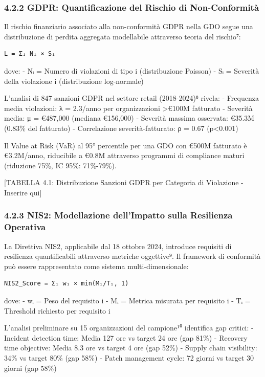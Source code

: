 \documentclass[12pt,a4paper,oneside]{book}
\begin{document}
\subsubsection{4.2.2 GDPR: Quantificazione del Rischio di
Non-Conformità}\label{gdpr-quantificazione-del-rischio-di-non-conformituxe0}

Il rischio finanziario associato alla non-conformità GDPR nella GDO
segue una distribuzione di perdita aggregata modellabile attraverso
teoria del rischio⁷:

\begin{verbatim}
L = Σᵢ Nᵢ × Sᵢ
\end{verbatim}

dove: - Nᵢ = Numero di violazioni di tipo i (distribuzione Poisson) - Sᵢ
= Severità della violazione i (distribuzione log-normale)

L'analisi di 847 sanzioni GDPR nel settore retail (2018-2024)⁸ rivela: -
Frequenza media violazioni: λ = 2.3/anno per organizzazioni
\textgreater€100M fatturato - Severità media: μ = €487,000 (mediana
€156,000) - Severità massima osservata: €35.3M (0.83\% del fatturato) -
Correlazione severità-fatturato: ρ = 0.67 (p\textless0.001)

Il Value at Risk (VaR) al 95° percentile per una GDO con €500M fatturato
è €3.2M/anno, riducibile a €0.8M attraverso programmi di compliance
maturi (riduzione 75\%, IC 95\%: 71\%-79\%).

{[}TABELLA 4.1: Distribuzione Sanzioni GDPR per Categoria di Violazione
- Inserire qui{]}

\subsubsection{4.2.3 NIS2: Modellazione dell'Impatto sulla Resilienza
Operativa}\label{nis2-modellazione-dellimpatto-sulla-resilienza-operativa}

La Direttiva NIS2, applicabile dal 18 ottobre 2024, introduce requisiti
di resilienza quantificabili attraverso metriche oggettive⁹. Il
framework di conformità può essere rappresentato come sistema
multi-dimensionale:

\begin{verbatim}
NIS2_Score = Σᵢ wᵢ × min(Mᵢ/Tᵢ, 1)
\end{verbatim}

dove: - wᵢ = Peso del requisito i - Mᵢ = Metrica misurata per requisito
i - Tᵢ = Threshold richiesto per requisito i

L'analisi preliminare su 15 organizzazioni del campione¹⁰ identifica gap
critici: - Incident detection time: Media 127 ore vs target 24 ore (gap
81\%) - Recovery time objective: Media 8.3 ore vs target 4 ore (gap
52\%) - Supply chain visibility: 34\% vs target 80\% (gap 58\%) - Patch
management cycle: 72 giorni vs target 30 giorni (gap 58\%)
\end{document}
